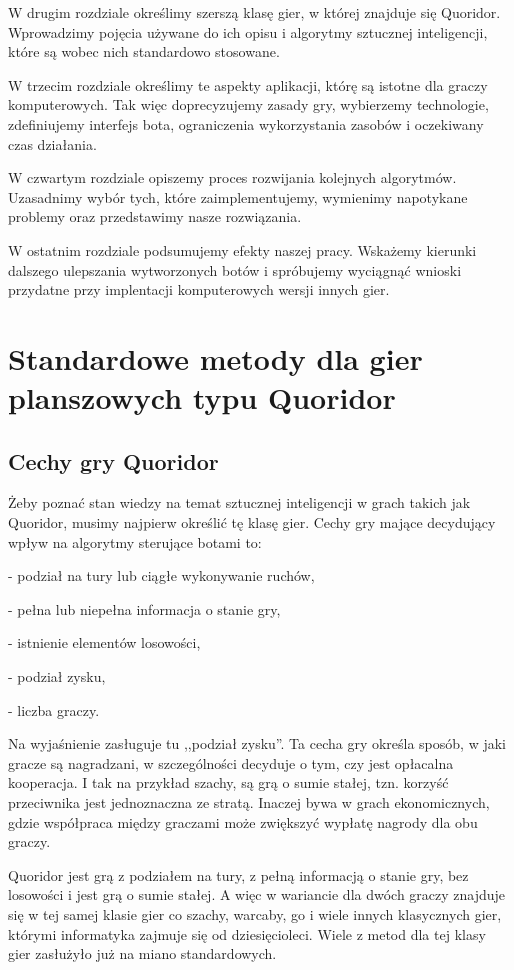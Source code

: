 \documentclass{pracamgr}
\begin{document}
W drugim rozdziale określimy szerszą klasę gier, w której znajduje się Quoridor.
Wprowadzimy pojęcia używane do ich opisu i algorytmy sztucznej inteligencji, które są wobec nich standardowo stosowane.

W trzecim rozdziale określimy te aspekty aplikacji, którę są istotne dla graczy komputerowych.
Tak więc doprecyzujemy zasady gry, wybierzemy technologie, zdefiniujemy interfejs bota, ograniczenia wykorzystania zasobów i oczekiwany czas działania.

W czwartym rozdziale opiszemy proces rozwijania kolejnych algorytmów.
Uzasadnimy wybór tych, które zaimplementujemy, wymienimy napotykane problemy oraz przedstawimy nasze rozwiązania.

W ostatnim rozdziale podsumujemy efekty naszej pracy.
Wskażemy kierunki dalszego ulepszania wytworzonych botów i spróbujemy wyciągnąć wnioski przydatne przy implentacji komputerowych wersji innych gier.

\chapter{Standardowe metody dla gier planszowych typu Quoridor}

\section{Cechy gry Quoridor}

Żeby poznać stan wiedzy na temat sztucznej inteligencji w grach takich jak Quoridor, musimy najpierw określić tę klasę gier.
Cechy gry mające decydujący wpływ na algorytmy sterujące botami to:

 - podział na tury lub ciągłe wykonywanie ruchów,

 - pełna lub niepełna informacja o stanie gry,

 - istnienie elementów losowości,

 - podział zysku,

 - liczba graczy.

Na wyjaśnienie zasługuje tu ,,podział zysku''.
Ta cecha gry określa sposób, w jaki gracze są nagradzani, w szczególności decyduje o tym, czy jest opłacalna kooperacja. I tak na przykład szachy, są grą o sumie stałej, tzn. korzyść przeciwnika jest jednoznaczna ze stratą. Inaczej bywa w grach ekonomicznych, gdzie współpraca między graczami może zwiększyć wypłatę nagrody dla obu graczy.

Quoridor jest grą z podziałem na tury, z pełną informacją o stanie gry, bez losowości i jest grą o sumie stałej.
A więc w wariancie dla dwóch graczy znajduje się w tej samej klasie gier co szachy, warcaby, go i wiele innych klasycznych gier, którymi informatyka zajmuje się od dziesięcioleci.
Wiele z metod dla tej klasy gier zasłużyło już na miano standardowych.
\end{document}
